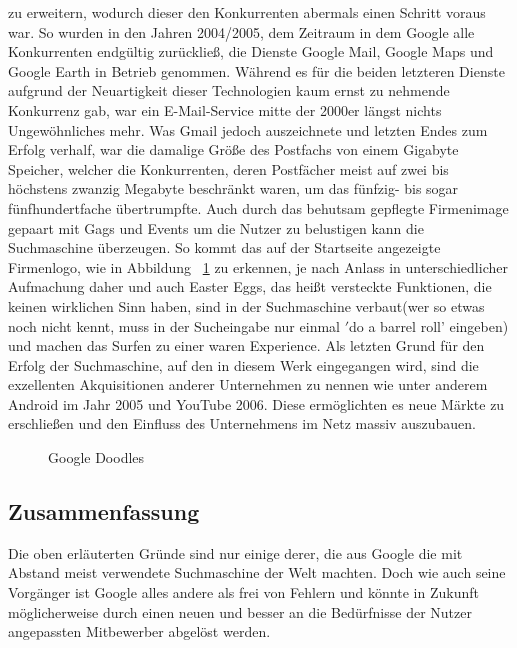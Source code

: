 zu erweitern, wodurch dieser den Konkurrenten abermals einen Schritt voraus war.
So wurden in den Jahren 2004/2005, dem Zeitraum in dem Google alle Konkurrenten endgültig zurückließ, die Dienste Google Mail,
Google Maps und Google Earth in Betrieb genommen.
Während es für die beiden letzteren Dienste aufgrund der Neuartigkeit dieser Technologien kaum ernst zu nehmende
Konkurrenz gab, war ein E-Mail-Service mitte der 2000er längst nichts Ungewöhnliches mehr.
Was Gmail jedoch auszeichnete und letzten Endes zum Erfolg verhalf, war die damalige Größe des Postfachs von einem
Gigabyte Speicher, welcher die Konkurrenten, deren Postfächer meist auf zwei bis höchstens zwanzig Megabyte beschränkt
waren, um das fünfzig- bis sogar fünfhundertfache übertrumpfte.
Auch durch das behutsam gepflegte Firmenimage gepaart mit Gags und Events um die Nutzer zu belustigen kann
die Suchmaschine überzeugen.
So kommt das auf der Startseite angezeigte Firmenlogo, wie in Abbildung ~\ref{fig:google_doodle} zu erkennen, je nach Anlass in
unterschiedlicher Aufmachung daher und auch Easter Eggs, das heißt versteckte Funktionen, die keinen wirklichen Sinn haben,
sind in der Suchmaschine verbaut(wer so etwas noch nicht kennt, muss in der Sucheingabe nur einmal \('\)do a barrel roll' eingeben)
und machen das Surfen zu einer waren Experience.
Als letzten Grund für den Erfolg der Suchmaschine, auf den in diesem Werk eingegangen wird, sind die exzellenten
Akquisitionen anderer Unternehmen zu nennen wie unter anderem Android im Jahr 2005 und YouTube 2006.
Diese ermöglichten es neue Märkte zu erschließen und den Einfluss des Unternehmens im Netz massiv auszubauen.

\begin{figure}[ht]
    \centering
    \caption{Google Doodles}\label{fig:google_doodle}
\end{figure}

\subsection{Zusammenfassung}\label{subsec:zusammenfassung}
Die oben erläuterten Gründe sind nur einige derer, die aus Google die mit Abstand meist verwendete Suchmaschine der Welt
machten.
Doch wie auch seine Vorgänger ist Google alles andere als frei von Fehlern und könnte in Zukunft möglicherweise durch einen
neuen und besser an die Bedürfnisse der Nutzer angepassten Mitbewerber abgelöst werden.